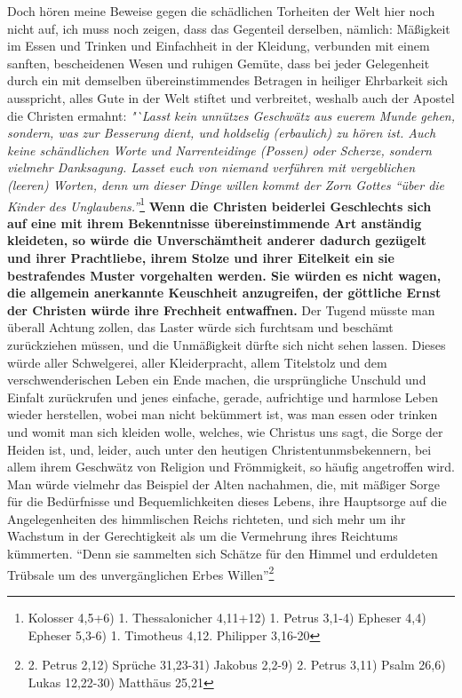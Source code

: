 Doch hören meine Beweise gegen die schädlichen Torheiten der Welt hier noch
nicht auf, ich muss noch zeigen, dass das Gegenteil derselben, nämlich:
Mäßigkeit
im Essen und Trinken und Einfachheit in der Kleidung, verbunden mit einem
sanften, bescheidenen Wesen und ruhigen Gemüte, dass bei jeder Gelegenheit durch
ein mit demselben übereinstimmendes Betragen in heiliger Ehrbarkeit sich
ausspricht, alles Gute in der Welt stiftet und verbreitet, weshalb auch der
Apostel die Christen ermahnt:
\textit{"`Lasst kein unnützes Geschwätz aus euerem Munde
gehen, sondern, was zur Besserung dient, und holdselig (erbaulich) zu hören
ist. Auch keine schändlichen Worte und Narrenteidinge (Possen) oder Scherze,
sondern vielmehr Danksagung. Lasset euch von niemand verführen mit vergeblichen
(leeren) Worten, denn um dieser Dinge willen kommt der Zorn Gottes "`über die
Kinder des Unglaubens."'}\footnote{
Kolosser 4,5+6)
1. Thessalonicher 4,11+12)
1. Petrus 3,1-4)
Epheser 4,4)
Epheser 5,3-6)
1. Timotheus 4,12.
Philipper 3,16-20}
\label{ref:18_08_vorbild_kleidung}\textbf{Wenn die Christen
beiderlei Geschlechts sich auf eine mit ihrem Bekenntnisse übereinstimmende Art
anständig kleideten, so würde die Unverschämtheit anderer dadurch gezügelt und
ihrer Prachtliebe, ihrem Stolze und ihrer Eitelkeit ein sie bestrafendes Muster
vorgehalten werden. Sie würden es nicht wagen, die allgemein anerkannte
Keuschheit anzugreifen, der göttliche Ernst der Christen würde ihre Frechheit
entwaffnen.} Der Tugend müsste man überall Achtung zollen, das Laster würde
sich furchtsam und beschämt zurückziehen müssen, und die Unmäßigkeit dürfte sich
nicht sehen lassen. Dieses würde aller Schwelgerei, aller Kleiderpracht, allem
Titelstolz und dem verschwenderischen Leben ein Ende machen, die ursprüngliche
Unschuld und Einfalt zurückrufen und jenes einfache, gerade, aufrichtige und
harmlose Leben wieder herstellen, wobei man nicht bekümmert ist, was man essen
oder trinken und womit man sich kleiden wolle, welches, wie Christus uns sagt,
die Sorge der Heiden ist, und, leider, auch unter den heutigen
Christentunmsbekennern, bei allem ihrem Geschwätz von Religion und
Frömmigkeit, so häufig angetroffen wird. Man würde vielmehr das Beispiel der
Alten nachahmen, die, mit mäßiger Sorge für die Bedürfnisse und Bequemlichkeiten
dieses Lebens, ihre Hauptsorge auf die Angelegenheiten des himmlischen
Reichs
richteten, und sich mehr um ihr Wachstum in der Gerechtigkeit als um die
Vermehrung ihres Reichtums kümmerten. "`Denn sie sammelten sich Schätze für
den Himmel und erduldeten Trübsale um des unvergänglichen Erbes
Willen"'\footnote{
2. Petrus 2,12)
Sprüche 31,23-31)
Jakobus 2,2-9)
2. Petrus 3,11)
Psalm 26,6)
Lukas 12,22-30)
Matthäus 25,21}

